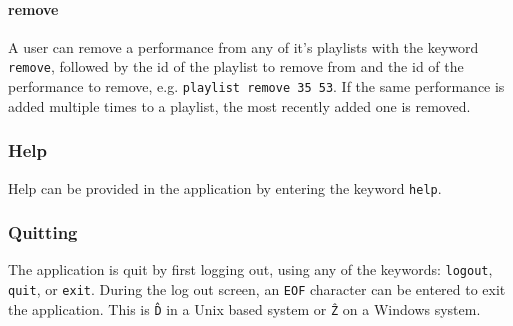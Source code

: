 \paragraph{remove}
A user can remove a performance from any of it's playlists with the keyword \texttt{remove}, followed
by the id of the playlist to remove from and the id of the performance to remove, e.g.
\texttt{playlist remove 35 53}. If the same performance is added multiple times to a playlist, the
most recently added one is removed.

\subsubsection{Help}
Help can be provided in the application by entering the keyword \texttt{help}.

\subsubsection{Quitting}
The application is quit by first logging out, using any of the keywords: \texttt{logout}, \texttt{quit},
or \texttt{exit}. During the log out screen, an \texttt{EOF} character can be entered to exit the
application. This is \texttt{\^D} in a Unix based system or \texttt{\^Z} on a Windows system.

